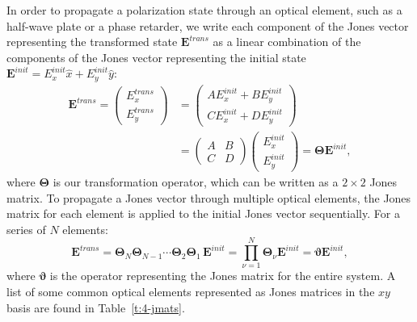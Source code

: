 In order to propagate a polarization state through an optical element, such as a half-wave plate or a phase retarder, we write each component of the Jones vector representing the transformed state $\mathbf{E}^{trans}$ as a linear combination of the components of the Jones vector representing the initial state $\mathbf{E}^{init} = E^{init}_{x}\hat{x}+E^{init}_{y}\hat{y}$:
\begin{align}
\mathbf{E}^{trans} = \left ( \begin{array}{c} E^{trans}_{x} \\ E^{trans}_{y} \end{array} \right ) &= \left ( \begin{array}{c} A E^{init}_{x} + B E^{init}_{y} \\ C E^{init}_{x}+ D E^{init}_{y} \end{array} \right ) \nonumber \\
&= \left ( \begin{array}{cc} A & B \\C & D \end{array} \right )\left ( \begin{array}{c} E^{init}_{x} \\ E^{init}_{y} \end{array} \right ) = \bm{\Theta} \mathbf{E}^{init},
\end{align}
where $\bm{\Theta}$ is our transformation operator, which can be written as a $2 \times 2$ Jones matrix.
To propagate a Jones vector through multiple optical elements, the Jones matrix for each element is applied to the initial Jones vector sequentially.
For a series of $N$ elements:
\begin{equation}
\mathbf{E}^{trans} = \bm{\Theta}_N \bm{\Theta}_{N-1} \cdots \bm{\Theta}_2 \bm{\Theta}_1\, \mathbf{E}^{init} = \prod\limits^N_{\nu=1} \bm{\Theta}_{\nu} \mathbf{E}^{init} = \bm{\vartheta} \mathbf{E}^{init},
\end{equation}
where $\bm{\vartheta}$ is the operator representing the Jones matrix for the entire system.
A list of some common optical elements represented as Jones matrices in the $xy$ basis are found in Table~\ref{t:4-jmats}.
